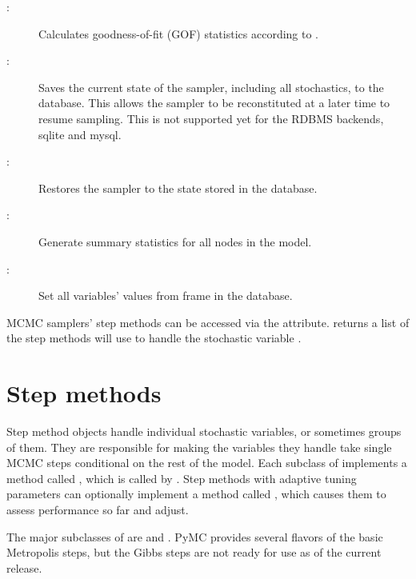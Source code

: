 \begin{description}
    \item[:] Calculates goodness-of-fit (GOF) statistics according to \cite{Brooks:2000il}.
    \item[:] Saves the current state of the sampler, including all stochastics, to the database. This allows the sampler to be reconstituted at a later time to resume sampling. This is not supported yet for the RDBMS backends, sqlite and mysql.
    \item[:] Restores the sampler to the state stored in the database.
	 \item[:] Generate summary statistics for all nodes in the model.
    \item[:] Set all variables' values from frame  in the database.
\end{description}


MCMC samplers' step methods can be accessed via the  attribute.  returns a list of the step methods  will use to handle the stochastic variable .

\hypertarget{step-method}{}
\section{Step methods} \label{sec:stepmethod}


Step method objects handle individual stochastic variables, or sometimes groups of them. They are responsible for making the variables they handle take single MCMC steps conditional on the rest of the model. Each subclass of  implements a method called , which is called by . Step methods with adaptive tuning parameters can optionally implement a method called , which causes them to assess performance so far and adjust.

The major subclasses of  are  and . PyMC provides several flavors of the basic Metropolis steps, but the Gibbs steps are not ready for use as of the current release. %


